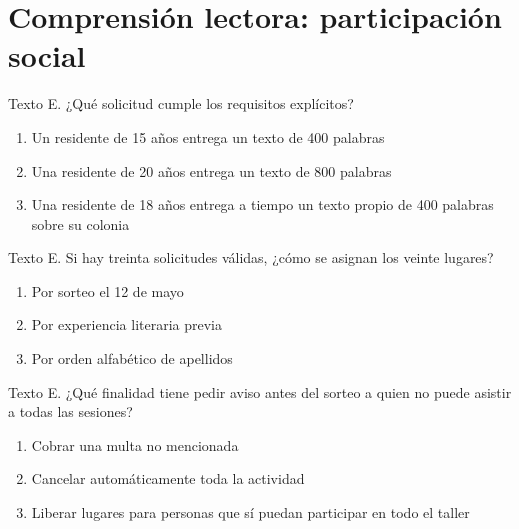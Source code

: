 \section{Comprensión lectora: participación social}



\noindent\begin{minipage}{\linewidth}\setlength{\parskip}{4pt}\label{q:L-025}
Texto E. ¿Qué solicitud cumple los requisitos explícitos?
\begin{enumerate}[label=\Alph*),nosep]
\item Un residente de 15 años entrega un texto de 400 palabras
\item Una residente de 20 años entrega un texto de 800 palabras
\item Una residente de 18 años entrega a tiempo un texto propio de 400 palabras sobre su colonia
\end{enumerate}\end{minipage}\par\medskip

\noindent\begin{minipage}{\linewidth}\setlength{\parskip}{4pt}\label{q:L-026}
Texto E. Si hay treinta solicitudes válidas, ¿cómo se asignan los veinte lugares?
\begin{enumerate}[label=\Alph*),nosep]
\item Por sorteo el 12 de mayo
\item Por experiencia literaria previa
\item Por orden alfabético de apellidos
\end{enumerate}\end{minipage}\par\medskip

\noindent\begin{minipage}{\linewidth}\setlength{\parskip}{4pt}\label{q:L-027}
Texto E. ¿Qué finalidad tiene pedir aviso antes del sorteo a quien no puede asistir a todas las sesiones?
\begin{enumerate}[label=\Alph*),nosep]
\item Cobrar una multa no mencionada
\item Cancelar automáticamente toda la actividad
\item Liberar lugares para personas que sí puedan participar en todo el taller
\end{enumerate}\end{minipage}\par\medskip

